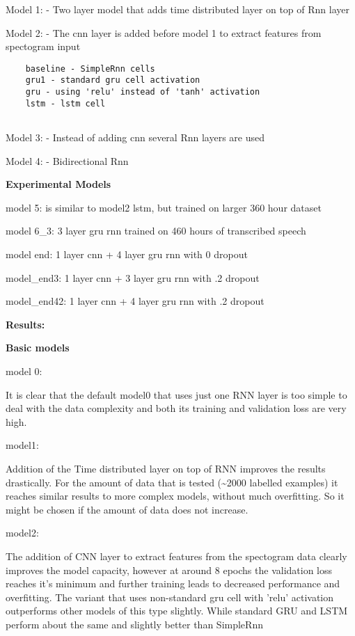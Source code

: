 \documentclass[11pt]{article}
\begin{document}
Model 1: - Two layer model that adds time distributed layer on top of
Rnn layer

Model 2: - The cnn layer is added before model 1 to extract features
from spectogram input

\begin{verbatim}
    baseline - SimpleRnn cells
    gru1 - standard gru cell activation
    gru - using 'relu' instead of 'tanh' activation
    lstm - lstm cell 
    
\end{verbatim}

Model 3: - Instead of adding cnn several Rnn layers are used

Model 4: - Bidirectional Rnn

\textbf{Experimental Models}

model 5: is similar to model2 lstm, but trained on larger 360 hour
dataset

model 6\_3: 3 layer gru rnn trained on 460 hours of transcribed speech

model end: 1 layer cnn + 4 layer gru rnn with 0 dropout

model\_end3: 1 layer cnn + 3 layer gru rnn with .2 dropout

model\_end42: 1 layer cnn + 4 layer gru rnn with .2 dropout

\textbf{Results:}

\textbf{Basic models}

model 0:

It is clear that the default model0 that uses just one RNN layer is too
simple to deal with the data complexity and both its training and
validation loss are very high.

model1:

Addition of the Time distributed layer on top of RNN improves the
results drastically. For the amount of data that is tested
(\textasciitilde{}2000 labelled examples) it reaches similar results to
more complex models, without much overfitting. So it might be chosen if
the amount of data does not increase.

model2:

The addition of CNN layer to extract features from the spectogram data
clearly improves the model capacity, however at around 8 epochs the
validation loss reaches it's minimum and further training leads to
decreased performance and overfitting. The variant that uses
non-standard gru cell with 'relu' activation outperforms other models of
this type slightly. While standard GRU and LSTM perform about the same
and slightly better than SimpleRnn
\end{document}
